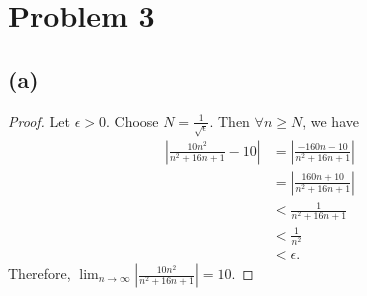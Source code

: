\documentclass{article}
\begin{document}
\section*{Problem 3}
\subsection*{(a)}
\begin{proof}
	Let $\epsilon > 0$. Choose $N = \frac{1}{\sqrt{\epsilon}}$. Then $\forall n \geq N$, we have
	\begin{align}
		\left|\frac{10n^2}{n^2 + 16n + 1} - 10\right| &= \left|\frac{-160n - 10}{n^2 + 16n + 1}\right| \\
		&= \left|\frac{160n + 10}{n^2 + 16n + 1}\right| \\
		&< \frac{1}{n^2 + 16n + 1} \\
		&< \frac{1}{n^2} \\
		&< \epsilon.
	\end{align}
	Therefore, $\lim_{n \to \infty} \left|\frac{10n^2}{n^2 + 16n + 1}\right| = 10$.
\end{proof}
\end{document}
